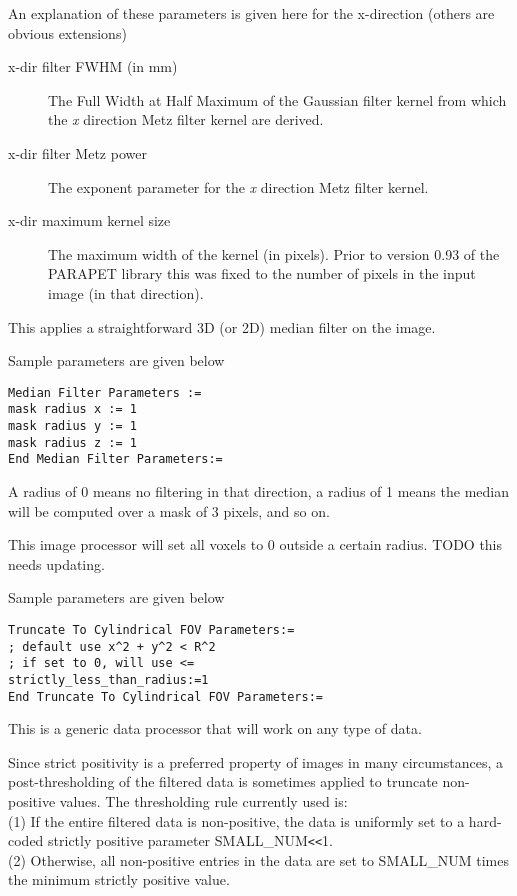 \documentclass{article}
\newcommand{\tab}{\hspace{5mm}}
\begin{document}
An explanation of these parameters is given here for the x-direction 
(others are obvious extensions)
\begin{description}
\item[x-dir filter FWHM (in mm)]
The Full Width at Half Maximum of the Gaussian filter kernel 
from which the \textit{x} direction Metz filter kernel are derived.

\item[x-dir filter Metz power]
The exponent parameter for the \textit{x} direction Metz filter kernel.

\item[x-dir maximum kernel size]
The maximum width of the kernel (in pixels). Prior to version 
0.93 of the PARAPET library this was fixed to the number of pixels 
in the input image (in that direction).
\end{description}

{ 
}
\label{sec:median}
This applies a straightforward 3D (or 2D) median filter on the 
image.

{ 
}

Sample parameters are given below

\begin{verbatim}
Median Filter Parameters := 
mask radius x := 1  
mask radius y := 1 
mask radius z := 1 
End Median Filter Parameters:=
\end{verbatim}


A radius of 0 means no filtering in that direction, a radius 
of 1 means the median will be computed over a mask of 3 pixels, 
and so on.


{ 
}
This image processor will set all voxels to 0 outside a certain radius.
TODO this needs updating.
{ 
}

Sample parameters are given below

\begin{verbatim}
Truncate To Cylindrical FOV Parameters:=
; default use x^2 + y^2 < R^2
; if set to 0, will use <=
strictly_less_than_radius:=1 
End Truncate To Cylindrical FOV Parameters:=
\end{verbatim}

{ 
}
This is a generic data processor that will work on any type of data.

Since strict positivity is a preferred property of images in 
many circumstances, a post-thresholding of the filtered data 
is sometimes applied to truncate non-positive values. The thresholding 
rule currently used is:\\
(1)\tab 
If the entire filtered data is non-positive, the data is uniformly 
set to a hard-coded strictly positive parameter SMALL\_NUM\texttt{<}\texttt{<}1.\\
(2)\tab 
Otherwise, all non-positive entries in the data are set to SMALL\_NUM 
times the minimum strictly positive value.
\end{document}
